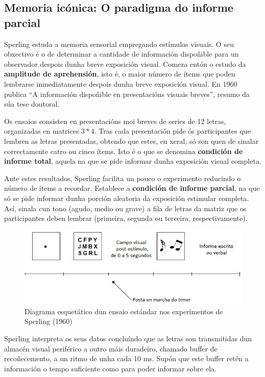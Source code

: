 \documentclass[a4paper,11pt]{article}
\begin{document}
\subsection{Memoria icónica: O paradigma do informe parcial}
Sperling estuda a memoria sensorial empregando estímulos visuais. O seu obxectivo é o de determinar a cantidade de información dispoñible para un observador despois dunha breve exposición visual. Comeza entón o estudo da \textbf{amplitude de aprehensión}, isto é, o maior número de ítems que poden lembrarse inmediatamente despois dunha breve exposición visual. En 1960 publica ``A información dispoñible en presentacións visuais breves'', resumo da súa tese doutoral.

Os ensaios consisten en presentacións moi breves de series de 12 letras, organizadas en matrices $3*4$. Tras cada presentación pide ós participantes que lembren as letras presentadas, obtendo que estes, en xeral, só son quen de sinalar correctamente catro ou cinco ítems. Isto é o que se denomina \textbf{condición de informe total}, aquela na que se pide informar dunha exposición visual completa.

Ante estes resultados, Sperling facilita un pouco o experimento reducindo o número de ítems a recordar. Establece a \textbf{condición de informe parcial}, na que só se pide informar dunha porción aleatoria da exposición estimular completa. Así, sinala cun tono (agudo, medio ou grave) a fila de letras da matriz que os participantes deben lembrar (primeira, segunda ou terceira, respectivamente).  

\begin{figure}[h!]
	\centering
	\includegraphics[width=0.8\linewidth]{memoria1_3}
	\caption{Diagrama esquetático dun ensaio estándar nos experimentos de Sperling (1960)}
\end{figure}

Sperling interpreta os seus datos concluíndo que as letras son transmitidas dun almacén visual periférico a outro máis duradeiro, chamado buffer de recoñecemento, a un ritmo de unha cada 10 ms. Supón que este buffer retén a información o tempo suficiente como para poder informar sobre ela. 
\end{document}
